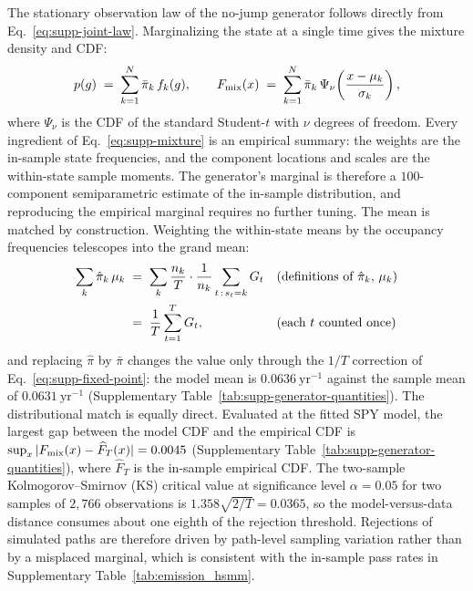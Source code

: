 The stationary observation law of the no-jump generator follows
directly from Eq.~\eqref{eq:supp-joint-law}. Marginalizing the state
at a single time gives the mixture density and CDF:
\begin{equation}
  p(g) \;=\; \sum_{k=1}^{N} \bar\pi_k\, f_k(g),
  \qquad
  F_{\rm mix}(x) \;=\; \sum_{k=1}^{N} \bar\pi_k\,
  \Psi_\nu\!\left(\frac{x - \mu_k}{\sigma_k}\right),
  \label{eq:supp-mixture}
\end{equation}
where $\Psi_\nu$ is the CDF of the standard Student-$t$ with $\nu$
degrees of freedom. Every ingredient of Eq.~\eqref{eq:supp-mixture} is
an empirical summary: the weights are the in-sample state
frequencies, and the component locations and scales are the
within-state sample moments. The generator's marginal is therefore a
$100$-component semiparametric estimate of the in-sample
distribution, and reproducing the empirical marginal requires no
further tuning. The mean is matched by construction. Weighting the
within-state means by the occupancy frequencies telescopes into the
grand mean:
\begin{align}
  \sum_{k} \hat\pi_k\, \mu_k
   &\;=\; \sum_{k} \frac{n_k}{T} \cdot \frac{1}{n_k}
     \sum_{t \,:\, s_t = k} G_t
     && \text{(definitions of $\hat\pi_k$, $\mu_k$)} \notag \\
   &\;=\; \frac{1}{T} \sum_{t=1}^{T} G_t,
     && \text{(each $t$ counted once)}
  \label{eq:supp-mean}
\end{align}
and replacing $\hat\pi$ by $\bar\pi$ changes the value only through
the $1/T$ correction of Eq.~\eqref{eq:supp-fixed-point}: the model
mean is $0.0636~\mathrm{yr}^{-1}$ against the sample mean of
$0.0631~\mathrm{yr}^{-1}$ (Supplementary Table~\ref{tab:supp-generator-quantities}).
The distributional match is equally direct.
Evaluated at the fitted SPY model, the largest gap between the model
CDF and the empirical CDF is
$\sup_x |F_{\rm mix}(x) - \widehat F_T(x)| = 0.0045$
(Supplementary Table~\ref{tab:supp-generator-quantities}), where
$\widehat F_T$ is the in-sample empirical CDF. The two-sample
Kolmogorov--Smirnov (KS) critical value at significance level
$\alpha = 0.05$ for two samples of $2{,}766$ observations is
$1.358 \sqrt{2/T} = 0.0365$, so the model-versus-data distance
consumes about one eighth of the rejection threshold. Rejections of
simulated paths are therefore driven by path-level sampling
variation rather than by a misplaced marginal, which is consistent
with the in-sample pass rates in
Supplementary Table~\ref{tab:emission_hsmm}.

